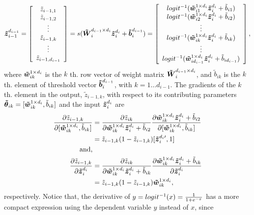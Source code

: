 \begin{equation*}
  \zDI{i-1}{i-1} = 
  \left[\begin{array}{c}
      \tilde{z}_{i-1,1} \\ 
      \tilde{z}_{i-1,2} \\ \vdots \\
      \tilde{z}_{i-1,k} \\ \vdots \\
      \tilde{z}_{i-1,d_{i-1}}
    \end{array}\right]
  = s(\WDI{i}{i-1}{i} \zDI{i}{i} + \bDI{i}{i-1})
  = \left[ \begin{array}{c}
      logit^{-1}(\wDI{i1}{i} \zDI{i}{i} + \tilde{b}_{i1}) \\
      logit^{-1}(\wDI{i2}{i} \zDI{i}{i} + \tilde{b}_{i2}) \\ \vdots \\
      logit^{-1}(\wDI{ik}{i} \zDI{i}{i} + \tilde{b}_{ik}) \\ \vdots \\
      logit^{-1}(\wDI{id_{i-1}}{i} \zDI{i}{i} + \tilde{b}_{id_{i-1}}) \\
    \end{array} \right],
\end{equation*}
where $\wDI{ik}{i}$ is the $k$ th. row vector of weight matrix $\WDI{i}{i-1}{i}$, and $\tilde{b}_{ik}$ is the $k$ th. element of threshold vector $\bDI{i}{i-1}$, with $k=1 \dots d_{i-1}$. The gradients of the $k$ th. element in the output, $\tilde{z}_{i-1,k}$, with respect to its contributing parameters $\pDC_{ik}=[\wDI{ik}{i}, \tilde{b}_{ik}]$ and the input $\zDI{i}{i}$ are
\begin{equation*}
  \begin{split}
    \PDV{\tilde{z}_{i-1,k}}{[\wDI{ik}{i}, \tilde{b}_{ik}]}
    &= \PDC{\tilde{z}_{ik}}{\wDI{ik}{i} \zDI{i}{i} + \tilde{b}_{i2}}{[\wDI{ik}{i}, \tilde{b}_{ik}]} \\
    &= \tilde{z}_{i-1,k}(1-\tilde{z}_{i-1,k})[\zDIt{i}{i},1] \\
    \text{and,} & \\
    \PDV{\tilde{z}_{i-1,k}}{\zDI{i}{i}}
    &= \PDC{\tilde{z}_{ik}}{\wDI{ik}{i} \zDI{i}{i} + \tilde{b}_{ik}}{\zDI{i}{i}} \\
    &= \tilde{z}_{i-1,k}(1-\tilde{z}_{i-1,k})\wDI{ik}{i},
  \end{split}
\end{equation*}
respectively. Notice that, the derivative of $y=logit^{-1}(x)=\SGM{x}$ has a more compact expression using the dependent variable $y$ instead of $x$, since
